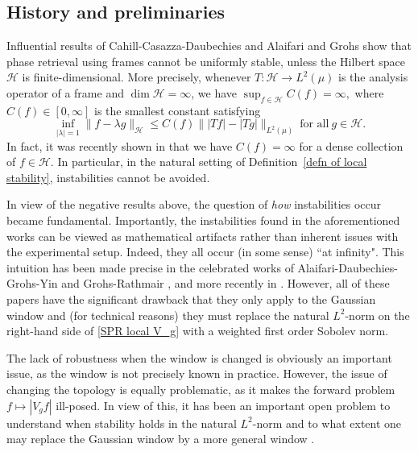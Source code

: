 \documentclass[11pt]{amsart}
\theoremstyle{remark}
\begin{document}
\subsection{History and preliminaries} Influential results of Cahill-Casazza-Daubechies \cite{MR3554699} and Alaifari and Grohs \cite{MR3656501} show that phase retrieval using frames  cannot be uniformly stable, unless the Hilbert space $\mathcal{H}$ is finite-dimensional. More precisely,  whenever $T:\mathcal{H} \to L^2(\mu)$ is the analysis operator of a frame and $\dim\mathcal{H}=\infty$, we have $\sup_{f\in \mathcal{H}}C(f)=\infty,$ where $C(f)\in [0,\infty]$ is the smallest constant satisfying
\begin{equation*}\label{LSPR intro}
    \inf_{|\lambda|=1}\|f-\lambda g\|_{\mathcal{H}}\leq C(f)\| |Tf|-|Tg|\|_{L^2(\mu)} \ \text{for all} \ g\in \mathcal{H}.
\end{equation*} 
 In fact, it was recently shown in \cite{Alharbi2024Locality} that we have $C(f)=\infty$ for a dense collection of $f\in \mathcal{H}$. In particular, in the natural setting of Definition~\ref{defn of local stability}, instabilities cannot be avoided. 
 \vspace{0.5em}

 In view of the negative results above, the question of \emph{how} instabilities occur became fundamental. Importantly, the instabilities found in the aforementioned works can be viewed as mathematical artifacts rather than inherent issues with the experimental setup. Indeed, they all occur (in some sense) ``at infinity". This intuition has been made precise in the celebrated works of Alaifari-Daubechies-Grohs-Yin \cite{alaifari2019Stable} and Grohs-Rathmair \cite{Grohs2019Stable,MR4404785}, and more recently in \cite{alaifari2025cheeger}. However, all of these papers have the significant drawback that they only apply to the Gaussian window and (for technical reasons) they must replace the natural $L^2$-norm on the right-hand side of \eqref{SPR local V_g} with a weighted first order Sobolev norm.
 \vspace{0.5em}
 
 The lack of robustness when the window is changed is obviously an important issue, as the window is not precisely known in practice. However, the issue of changing the topology is equally problematic, as it makes the forward problem $f\mapsto |V_gf|$ ill-posed. In view of this, it has been an important open problem to understand when stability holds in the natural $L^2$-norm and to what extent one may replace the Gaussian window by a more general window \cite{rathmair2024stable}.
\end{document}
